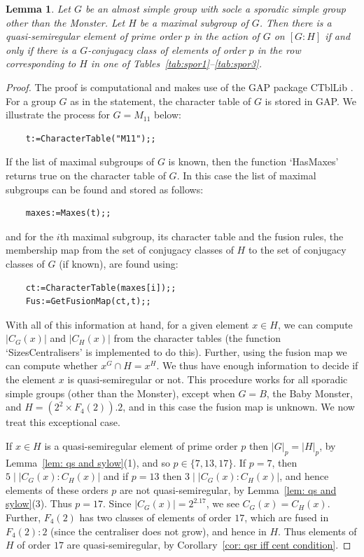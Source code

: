 \documentclass{article}
\newtheorem{lem}[thm]{Lemma}
\theoremstyle{remark}
\theoremstyle{definition}
\newcommand{\qsr}{quasi-semiregular}
\newcommand{\qsre}{quasi-semiregular element}
\begin{document}
\begin{lem}
\label{lem: sporadic but not monster}
    Let $G$ be an almost simple group with socle a sporadic simple group other than the Monster. Let $H$ be a maximal subgroup of $G$. Then there is a {\qsre} of prime order $p$ in the action of $G$ on $[G:H]$ if and only if there is a $G$-conjugacy class of elements of order $p$ in the row corresponding to $H$ in one of Tables~\ref{tab:spor1}--\ref{tab:spor3}.
\end{lem}
\begin{proof}
The proof is computational and makes use of the GAP \cite{GAP4} package CTblLib \cite{CTblLib}. For a group $G$ as in the statement, the character table of $G$ is stored in GAP. We illustrate the process for $G=M_{11}$ below:
\begin{verbatim}
    t:=CharacterTable("M11");;
\end{verbatim} If the list of maximal subgroups of $G$ is known, then the function `HasMaxes' returns true on the character table of $G$. In this case the list of maximal subgroups can be found and stored as follows:
\begin{verbatim}
    maxes:=Maxes(t);;
\end{verbatim}
and for the $i$th maximal subgroup, its character table and the fusion rules, the membership map from the set of conjugacy classes of $H$ to the set of conjugacy classes of $G$ (if known), are found using:
\begin{verbatim}
    ct:=CharacterTable(maxes[i]);;
    Fus:=GetFusionMap(ct,t);;
\end{verbatim}
With all of this information at hand, for a given element $x \in H$, we can compute $|C_G(x)|$ and $|C_H(x)|$ from the character tables (the function `SizesCentralisers' is implemented to do this). Further, using the fusion map we can compute whether $x^G \cap H = x^H$. We thus have enough information to decide if the element $x$ is {\qsr} or not. This procedure works for all sporadic simple groups (other than the Monster), except when $G=B$, the Baby Monster, and $H=(2^2 \times F_4(2)).2$, and in this case the fusion map is unknown. We now treat this exceptional case.

If $x\in H$ is a {\qsre} of prime order $p$ then $|G|_p=|H|_p$, by Lemma~\ref{lem: qs and sylow}(1),  and so $p\in \{7,13,17\}$. If $p=7$, then $5 \mid |C_G(x):C_H(x)|$ and if $p=13$ then $3 \mid |C_G(x):C_H(x)|$, and hence elements of these orders $p$ are not {\qsr}, by Lemma~\ref{lem: qs and sylow}(3). Thus $p=17$. Since $|C_G(x)|=2^2.17$, we see $C_G(x)=C_H(x)$. Further, $F_4(2)$ has two classes of elements of order $17$, which are fused in $F_4(2):2$ (since the centraliser does  not grow), and hence in $H$. Thus elements of $H$ of order $17$ are {\qsr}, by Corollary~\ref{cor: qsr iff cent condition}.
\end{proof}
\end{document}
